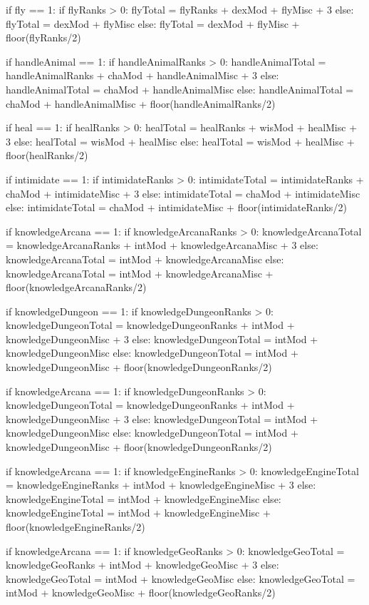 \begin{python}
if fly == 1:
	 if flyRanks > 0:
	  flyTotal = flyRanks + dexMod + flyMisc + 3
	 else:
	  flyTotal = dexMod + flyMisc
else:
	 flyTotal = dexMod + flyMisc + floor(flyRanks/2)

if handleAnimal == 1:
	 if handleAnimalRanks > 0:
	  handleAnimalTotal = handleAnimalRanks + chaMod + handleAnimalMisc + 3
	 else:
	  handleAnimalTotal = chaMod + handleAnimalMisc
else:
	 handleAnimalTotal = chaMod + handleAnimalMisc + floor(handleAnimalRanks/2)

if heal == 1:
	 if healRanks > 0:
	  healTotal = healRanks + wisMod + healMisc + 3
	 else:
	  healTotal = wisMod + healMisc
else:
	 healTotal = wisMod + healMisc + floor(healRanks/2)

if intimidate == 1:
	 if intimidateRanks > 0:
	  intimidateTotal = intimidateRanks + chaMod + intimidateMisc + 3
	 else:
	  intimidateTotal = chaMod + intimidateMisc
else:
	 intimidateTotal = chaMod + intimidateMisc + floor(intimidateRanks/2)

if knowledgeArcana == 1:
	 if knowledgeArcanaRanks > 0:
	  knowledgeArcanaTotal = knowledgeArcanaRanks + intMod + knowledgeArcanaMisc + 3
	 else:
	  knowledgeArcanaTotal = intMod + knowledgeArcanaMisc
else:
	 knowledgeArcanaTotal = intMod + knowledgeArcanaMisc + floor(knowledgeArcanaRanks/2)

if knowledgeDungeon == 1:
	 if knowledgeDungeonRanks > 0:
	  knowledgeDungeonTotal = knowledgeDungeonRanks + intMod + knowledgeDungeonMisc + 3
	 else:
	  knowledgeDungeonTotal = intMod + knowledgeDungeonMisc
else:
	 knowledgeDungeonTotal = intMod + knowledgeDungeonMisc + floor(knowledgeDungeonRanks/2)

if knowledgeArcana == 1:
	 if knowledgeDungeonRanks > 0:
	  knowledgeDungeonTotal = knowledgeDungeonRanks + intMod + knowledgeDungeonMisc + 3
	 else:
	  knowledgeDungeonTotal = intMod + knowledgeDungeonMisc
else:
	 knowledgeDungeonTotal = intMod + knowledgeDungeonMisc + floor(knowledgeDungeonRanks/2)

if knowledgeArcana == 1:
	 if knowledgeEngineRanks > 0:
	  knowledgeEngineTotal = knowledgeEngineRanks + intMod + knowledgeEngineMisc + 3
	 else:
	  knowledgeEngineTotal = intMod + knowledgeEngineMisc
else:
	 knowledgeEngineTotal = intMod + knowledgeEngineMisc + floor(knowledgeEngineRanks/2)

if knowledgeArcana == 1:
	 if knowledgeGeoRanks > 0:
	  knowledgeGeoTotal = knowledgeGeoRanks + intMod + knowledgeGeoMisc + 3
	 else:
	  knowledgeGeoTotal = intMod + knowledgeGeoMisc
else:
	 knowledgeGeoTotal = intMod + knowledgeGeoMisc + floor(knowledgeGeoRanks/2)


\end{python}
